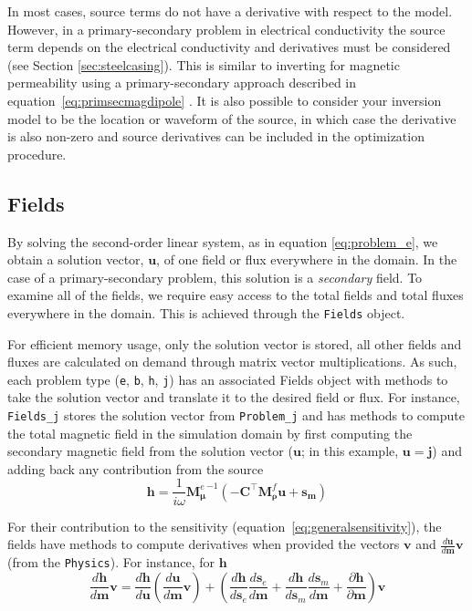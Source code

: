\documentclass[preprint,review,3p,times,onecolumn,authoryear]{elsarticle}
\newcommand{\sm}{\mathbf{s}_m}
\newcommand{\se}{\mathbf{s}_e}
\newcommand{\M}{{\mathbf M}}
\newcommand{\MfRho}{{\M^f_{\boldsymbol{\rho}}}}
\newcommand{\MeMu}{{\M^e_{\boldsymbol{\mu}}}}
\begin{document}
In most cases, source terms do not have a derivative with respect to the model.
However, in a primary-secondary problem in electrical conductivity the source
term depends on the electrical conductivity and derivatives must be considered
(see Section \ref{sec:steelcasing}). This is similar to inverting for
magnetic permeability using a primary-secondary approach described in
equation~\ref{eq:primsecmagdipole} \citep{Coggon1971, Haber2014a, Heagy2015}. It is also
possible to consider your inversion model to be the location or waveform of the source,
in which case the derivative is also non-zero and source derivatives can be
included in the optimization procedure.



\subsection{Fields}
\label{sec:Fields}

By solving the second-order linear system, as in equation \ref{eq:problem_e},
we obtain a solution vector, $\mathbf{u}$, of one field or flux everywhere in the
domain. In the case of a primary-secondary problem, this solution is a
\emph{secondary} field. To examine all of the fields, we require easy
access to the total fields and total fluxes everywhere in the domain.
This is achieved through the \texttt{Fields} object.

For efficient memory usage, only the solution vector is stored, all other
fields and fluxes are calculated on demand through matrix vector
multiplications. As such, each problem type
(\texttt{e}, \texttt{b}, \texttt{h}, \texttt{j}) has an associated Fields object
with methods to take the solution vector and translate it to the desired field
or flux. For instance, \texttt{Fields\_j} stores the solution vector from
\texttt{Problem\_j} and has methods to compute the total magnetic field in the
simulation domain by first computing the secondary magnetic field
from the solution vector ($\mathbf{u}$; in this example, $\mathbf{u} = \mathbf{j}$) and adding back any
contribution from the source
\begin{equation}
    \mathbf{h} = \frac{1}{i\omega} \MeMu^{-1} \left(-\mathbf{C}^{\top} \MfRho \mathbf{u} + \mathbf{s_m} \right)
\label{eq:h_from_j}
\end{equation}

For their contribution to the sensitivity
(equation~\ref{eq:generalsensitivity}), the fields have methods to compute
derivatives when provided the vectors $\mathbf{v}$ and
$\frac{d\mathbf{u}}{d\mathbf{m}} \mathbf{v}$ (from the \texttt{Physics}). For instance,
for $\mathbf{h}$
\begin{equation}
 \frac{d\mathbf{h}}{d\mathbf{m}} \mathbf{v} =
 \frac{d\mathbf{h}}{d\mathbf{u}} \left(\frac{d\mathbf{u}}{d\mathbf{m}} \mathbf{v} \right)
        + \left(\frac{d\mathbf{h}}{d\se} \frac{d\se}{d\mathbf{m}}
        + \frac{d\mathbf{h}}{d\sm} \frac{d\sm}{d\mathbf{m}}
        + \frac{\partial\mathbf{h}}{\partial\mathbf{m}} \right)\mathbf{v}
\label{eq:dhdm}
\end{equation}
\end{document}
